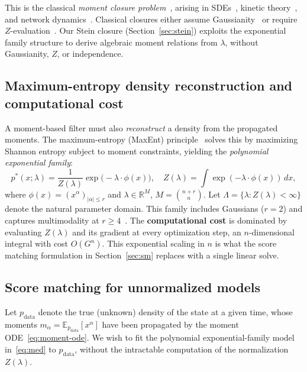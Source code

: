 \documentclass{article}
\newcommand{\R}{\mathbb{R}}
\newcommand{\E}{\mathbb{E}}
\theoremstyle{definition}
\begin{document}
This is the classical \emph{moment closure problem}~\cite{kuehn2016},
arising in SDEs~\cite{whittle1957,gillespie2009},
kinetic theory~\cite{grad1949,levermore1996},
and network dynamics~\cite{kirkwood1935,keeling1999,kiss2017}.
Classical closures either assume Gaussianity~\cite{whittle1957} or require
$Z$-evaluation~\cite{levermore1996,singh2011}.
Our Stein closure (Section~\ref{sec:stein})
exploits the exponential family structure to derive algebraic
moment relations from $\lambda$, without Gaussianity, $Z$, or independence.

\subsection{Maximum-entropy density reconstruction and computational cost}

A moment-based filter must also \emph{reconstruct} a density from
the propagated moments.
The maximum-entropy (MaxEnt) principle~\cite{mead1984}
solves this by maximizing Shannon entropy subject to moment constraints,
yielding the \emph{polynomial exponential family}:
\begin{equation}\label{eq:med}
    p^*(x;\lambda)
    = \frac{1}{Z(\lambda)}\exp \bigl(-\lambda \cdot \phi(x)\bigr),
    \quad
    Z(\lambda) = \int \exp(-\lambda \cdot \phi(x))\,dx,
\end{equation}
where $\phi(x) = (x^\alpha)_{|\alpha| \le r}$ and
$\lambda \in \R^M$, $M = \binom{n+r}{n}$.
Let $\Lambda=\{\lambda:Z(\lambda)<\infty\}$ denote the natural
parameter domain.
This family includes Gaussians ($r{=}2$) and captures
multimodality at $r \ge 4$~\cite{teng2025}.
The \textbf{computational cost} is dominated by evaluating $Z(\lambda)$
and its gradient at every optimization step,
an $n$-dimensional integral with cost $O(G^n)$.
This exponential scaling in $n$ is what the score matching formulation
in Section~\ref{sec:sm} replaces with a single linear solve.

\subsection{Score matching for unnormalized models}

Let $p_{\mathrm{data}}$ denote the true (unknown) density of the state
at a given time, whose moments $m_\alpha = \E_{p_{\mathrm{data}}}[x^\alpha]$
have been propagated by the moment ODE~\eqref{eq:moment-ode}.
We wish to fit the polynomial exponential-family model in~\eqref{eq:med}
to $p_{\mathrm{data}}$,
without the intractable computation of the normalization $Z(\lambda)$.
\end{document}
